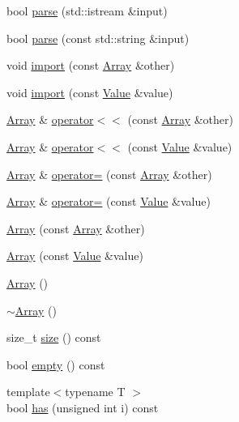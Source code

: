 \begin{DoxyCompactItemize}
\item 
bool \hyperlink{classjsonxx_1_1_array_af83237b60bde755985ace8af51996040}{parse} (std\+::istream \&input)
\item 
bool \hyperlink{classjsonxx_1_1_array_a7616aa963d2500cad73027fd7be2a76a}{parse} (const std\+::string \&input)
\item 
void \hyperlink{classjsonxx_1_1_array_a5babf25e4cccfb5a1283530152d8954e}{import} (const \hyperlink{classjsonxx_1_1_array}{Array} \&other)
\item 
void \hyperlink{classjsonxx_1_1_array_a55457d3987ff7be2e0db3b7081bc7201}{import} (const \hyperlink{classjsonxx_1_1_value}{Value} \&value)
\item 
\hyperlink{classjsonxx_1_1_array}{Array} \& \hyperlink{classjsonxx_1_1_array_ac3592108e523216ff0a8d4ee2e433f1f}{operator$<$$<$} (const \hyperlink{classjsonxx_1_1_array}{Array} \&other)
\item 
\hyperlink{classjsonxx_1_1_array}{Array} \& \hyperlink{classjsonxx_1_1_array_a70d71a2f54cfb78014ee128a5bd871f6}{operator$<$$<$} (const \hyperlink{classjsonxx_1_1_value}{Value} \&value)
\item 
\hyperlink{classjsonxx_1_1_array}{Array} \& \hyperlink{classjsonxx_1_1_array_abe8589c431ec8e37b6587d012dfdbad5}{operator=} (const \hyperlink{classjsonxx_1_1_array}{Array} \&other)
\item 
\hyperlink{classjsonxx_1_1_array}{Array} \& \hyperlink{classjsonxx_1_1_array_acea567b7f3221639327335a76d30ba30}{operator=} (const \hyperlink{classjsonxx_1_1_value}{Value} \&value)
\item 
\hyperlink{classjsonxx_1_1_array_ac056f93d51ff935f5a20d4edfb1c8bb0}{Array} (const \hyperlink{classjsonxx_1_1_array}{Array} \&other)
\item 
\hyperlink{classjsonxx_1_1_array_a3888dd7125eeab6daf89dcf5c61cafa7}{Array} (const \hyperlink{classjsonxx_1_1_value}{Value} \&value)
\item 
\hyperlink{classjsonxx_1_1_array_a3b3cdb6b0c83d0f348f04f551595dfb3}{Array} ()
\item 
\hyperlink{classjsonxx_1_1_array_a8e93b44595aed126f26a396540b61ea7}{$\sim$\+Array} ()
\item 
size\+\_\+t \hyperlink{classjsonxx_1_1_array_a525ba16b450422c39a90c346496676f6}{size} () const 
\item 
bool \hyperlink{classjsonxx_1_1_array_a164966e763f9d8aa74b226845f97cde6}{empty} () const 
\item 
{\footnotesize template$<$typename T $>$ }\\bool \hyperlink{classjsonxx_1_1_array_a5acabe14f95a52c755339240d59a7406}{has} (unsigned int i) const 

\end{DoxyCompactItemize}
